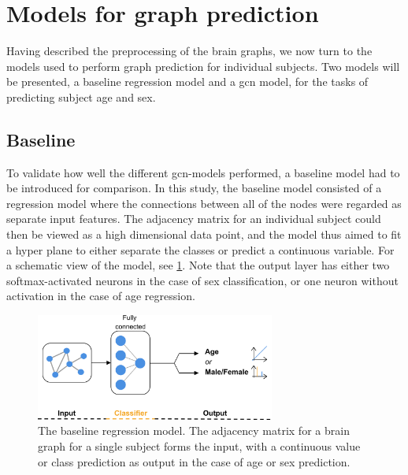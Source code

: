 \section{Models for graph prediction}

Having described the preprocessing of the brain graphs, we now turn to the models used to perform graph prediction for individual subjects. Two models will be presented, a baseline regression model and a \acrshort{gcn} model, for the tasks of predicting subject age and sex.

\subsection{Baseline}
To validate how well the different \acrshort{gcn}-models performed, a baseline model had to be introduced for comparison. In this study, the baseline model consisted of a regression model where the connections between all of the nodes were regarded as separate input features. The adjacency matrix for an individual subject could then be viewed as a high dimensional data point, and the model thus aimed to fit a hyper plane to either separate the classes or predict a continuous variable. For a schematic view of the model, see \cref{fig:Graph_class_baseline}. Note that the output layer has either two softmax-activated neurons in the case of sex classification, or one neuron without activation in the case of age regression. 


\begin{figure}[!htbp]
    \centering
    \includegraphics[width=0.7\textwidth]{chapters/images_methods/ffnn_v2.png}
    \caption{The baseline regression model. The adjacency matrix for a brain graph for a single subject forms the input, with a continuous value or class prediction as output in the case of age or sex prediction.}
    \label{fig:Graph_class_baseline}
\end{figure}


